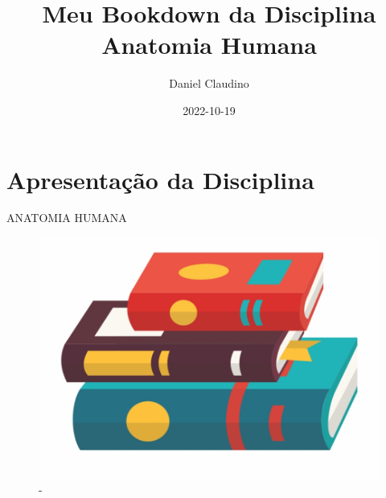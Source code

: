 \documentclass[
]{book}
\title{Meu Bookdown da Disciplina Anatomia Humana}
\author{Daniel Claudino}
\date{2022-10-19}
\begin{document}
\maketitle

{
\setcounter{tocdepth}{1}
\tableofcontents
}
\hypertarget{apresentauxe7uxe3o-da-disciplina}{%
\chapter{Apresentação da Disciplina}\label{apresentauxe7uxe3o-da-disciplina}}

ANATOMIA HUMANA

\begin{figure}

{\centering \includegraphics[width=0.5\linewidth]{figuras/LIVRO-GENERICO} 

}

\caption{-}\label{fig:unnamed-chunk-1}
\end{figure}
\end{document}
